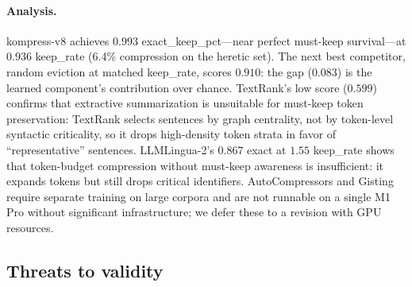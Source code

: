 \paragraph{Analysis.} kompress-v8 achieves $0.993$ exact\_keep\_pct---near
perfect must-keep survival---at $0.936$ keep\_rate (6.4\% compression on the
heretic set). The next best competitor, random eviction at matched
keep\_rate, scores $0.910$: the gap ($0.083$) is the learned component's
contribution over chance. TextRank's low score ($0.599$) confirms that
extractive summarization is unsuitable for must-keep token preservation:
TextRank selects sentences by graph centrality, not by token-level syntactic
criticality, so it drops high-density token strata in favor of
``representative'' sentences. LLMLingua-2's $0.867$ exact at $1.55$ keep\_rate
shows that token-budget compression without must-keep awareness is
insufficient: it expands tokens but still drops critical identifiers.
AutoCompressors and Gisting require separate training on large corpora and
are not runnable on a single M1 Pro without significant infrastructure; we
defer these to a revision with GPU resources.

\subsection{Threats to validity}
\label{sec:threats}

